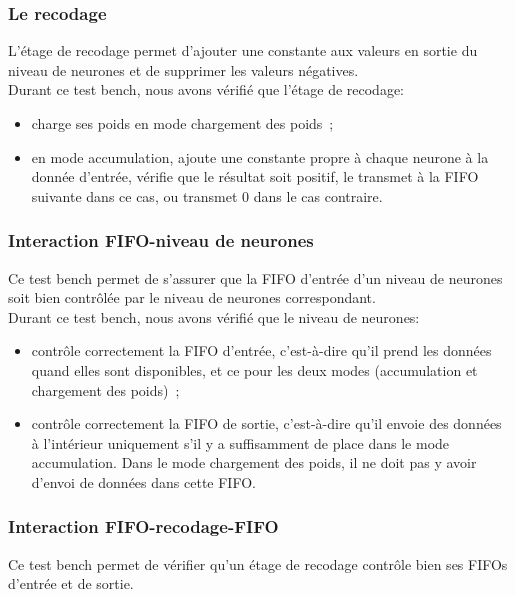 \subsubsection{Le recodage}

L'étage de recodage permet d'ajouter une constante aux valeurs en sortie du
niveau de neurones et de supprimer les valeurs négatives.\\

Durant ce test bench, nous avons vérifié que l'étage de recodage:
\begin{itemize}
	\item charge ses poids en mode chargement des poids~;
	\item en mode accumulation, ajoute une constante propre à chaque neurone
	à la donnée d'entrée, vérifie que le résultat soit positif, le transmet à
	la FIFO suivante dans ce cas, ou transmet 0 dans le cas contraire.
\end{itemize}

\subsubsection{Interaction FIFO-niveau de neurones}

Ce test bench permet de s'assurer que la FIFO d'entrée d'un niveau de neurones
soit bien contrôlée par le niveau de neurones correspondant.\\

Durant ce test bench, nous avons vérifié que le niveau de neurones:
\begin{itemize}
	\item contrôle correctement la FIFO d'entrée, c'est-à-dire qu'il prend
	les données quand elles sont disponibles, et ce pour les deux modes
	(accumulation et chargement des poids)~;
	\item contrôle correctement la FIFO de sortie, c'est-à-dire qu'il envoie
	des données à l'intérieur uniquement s'il y a suffisamment de place dans
	le mode accumulation. Dans le mode chargement des poids, il ne doit pas
	y avoir d'envoi de données dans cette FIFO.
\end{itemize}

\subsubsection{Interaction FIFO-recodage-FIFO}

Ce test bench permet de vérifier qu'un étage de recodage contrôle bien ses FIFOs
d'entrée et de sortie.\\

